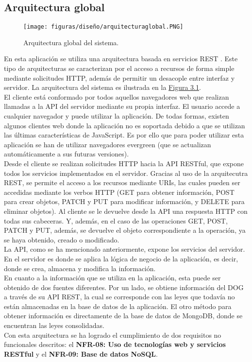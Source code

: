 \subsection{Arquitectura global}

\begin{figure}[H]
\centerline{\texttt{[image: figuras/diseño/arquitecturaglobal.PNG]}}
\caption{Arquitectura global del sistema.}
\label{enlaceArquitecturaGlobal}
\end{figure}

En esta aplicación se utiliza una arquitectura basada en servicios REST \cite{rest}. Este tipo de arquitecturas se caracterizan por el acceso a recursos de forma simple mediante solicitudes HTTP, además de permitir un desacople entre interfaz y servidor. La arquitectura del sistema es ilustrada en la \hyperref[enlaceArquitecturaGlobal]{Figura 3.1}.
\\

El cliente está conformado por todos aquellos navegadores web que realizan llamadas a la API del servidor mediante su propia interfaz. El usuario accede a cualquier navegador y puede utilizar la aplicación. De todas formas, existen algunos clientes web donde la aplicación no es soportada debido a que se utilizan las últimas características de JavaScript. Es por ello que para poder utilizar esta aplicación se han de utilizar navegadores evergreen \cite{evergreen} (que se actualizan automáticamente a sus futuras versiones).
\\

Desde el cliente se realizan solicitudes HTTP hacia la API RESTful, que expone todos los servicios implementados en el servidor. Gracias al uso de la arquitecutra REST, se permite el acceso a los recursos mediante URIs, las cuales pueden ser accedidas mediante los verbos HTTP (GET para obtener información, POST para crear objetos, PATCH y PUT para modificar información, y DELETE para eliminar objetos). Al cliente se le devuelve desde la API una respuesta HTTP con todas sus cabeceras. Y, además, en el caso de las operaciones GET, POST, PATCH y PUT, además, se devuelve el objeto correspondiente a la operación, ya se haya obtenido, creado o modificado.
\\

La API, como se ha mencionado anteriormente, expone los servicios del servidor. En el servidor es donde se aplica la lógica de negocio \cite{logicanegocio} de la aplicación, es decir, donde se crea, almacena y modifica la información.
\\

En cuanto a la información que se utiliza en la aplicación, esta puede ser obtenido de dos fuentes diferentes. Por un lado, se obtiene información del DOG a través de su API REST, la cual se corresponde con las leyes que todavía no están almacenadas en la base de datos de la aplicación. El otro método para obtener información es directamente de la base de datos de MongoDB, donde se encuentran las leyes consolidadas.
\\

Con esta arquitectura se ha logrado el cumplimiento de dos requisitos no funcionales descritos: el {\bf NFR-08: Uso de tecnologías web y servicios RESTful} y el {\bf NFR-09: Base de datos NoSQL}.